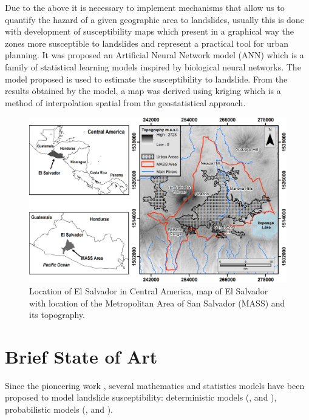 \documentclass[11pt,twoside]{rmta2010esp}%
\begin{document}
Due to the above it is necessary to implement mechanisms that allow us to quantify the hazard of a given geographic area to landslides, usually this is done with development of susceptibility maps which present in a graphical way the zones more susceptible to landslides and represent a practical tool for urban planning. It was proposed an Artificial Neural Network model (ANN) which is a family of statistical learning models inspired by biological neural networks. The model proposed is used to estimate the susceptibility to landslide. From the results obtained by the model, a map was derived using kriging which is a method of interpolation spatial from the geostatistical approach. 


 \begin{center}
  \begin{figure}
   \centering
   \includegraphics[scale=0.70]{MASS_mapa_1}
   \caption{\small{Location of El Salvador in Central America, map of El Salvador with location of the Metropolitan Area of San Salvador (MASS) and its topography.}}
   \label{fig:mass01}
  \end{figure}
 \end{center}




\section{Brief State of Art}
\label{sec:brief}
Since the pioneering work \cite{Carrara1983403}, several mathematics and statistics models have been proposed to model landslide susceptibility: deterministic models (\cite{hessd-10-12643-2013},  \cite{doi:10.1080/19475705.2010.498151} and \cite{Neu2012511}), probabilistic models (\cite{Bern198839}, \cite{Chung2003451} and \cite{doi:10.1080/01431160310001618734} ). 
\end{document}
